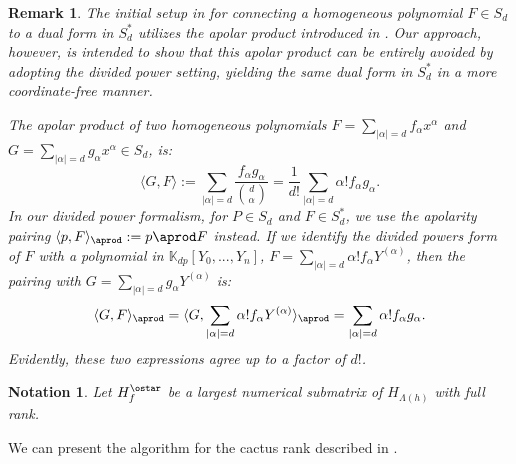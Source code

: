 \documentclass[a4paper,11p]{amsart}
\newtheorem{notation}{Notation}[section]
\newtheorem{remark0}[defn0]{Remark}
\newenvironment{remark}{ \begin{remark0}\rm}{\end{remark0}}
\newcommand{\K}{\mathbb K}
\begin{document}



\begin{remark}
The initial setup in \cite{Alessandra} for connecting a homogeneous polynomial $F \in S_d$ to a dual form in $S_d^*$ utilizes the apolar product introduced in \cite{Bernard}. Our approach, however, is intended to show that this apolar product can be entirely avoided by adopting the divided power setting, yielding the same dual form in $S_d^*$ in a more coordinate-free manner.

The apolar product of two homogeneous polynomials $F=\sum_{|\alpha|=d} f_{\alpha}x^{\alpha}$ and $G=\sum_{|\alpha|=d} g_{\alpha}x^{\alpha}\in S_d$, is: %
\[\langle G,F \rangle:=\sum_{|\alpha|=d} \frac{f_\alpha g_\alpha}{\binom{d}{\alpha}}=\frac{1}{d!}\sum_{|\alpha|=d} \alpha! f_\alpha g_\alpha. \]
In our divided power formalism, for $P\in S_d$ and $F\in S_d^*$, we use the apolarity pairing $\langle p, F\rangle_{\aprod}:= p\aprod F$ instead. If we identify the divided powers form of $F$ with a polynomial in $\K_{dp}[Y_0,...,Y_n]$, $F=\sum_{|\alpha|=d}\alpha! f_\alpha Y^{(\alpha)}$, then the pairing with $G=\sum_{|\alpha|=d} g_{\alpha}Y^{(\alpha)}$ is:
\[\langle G,F\rangle_\aprod=\langle G,\sum_{|\alpha|=d} \alpha! f_\alpha Y^{(\alpha)}\rangle_\aprod =\sum_{|\alpha|=d} \alpha! f_\alpha g_\alpha.\]
Evidently, these two expressions agree up to a factor of $d!$.
\end{remark}



\begin{notation}\label{notation: InitialRank}
Let $H_f^{\ostar}$ be a largest numerical submatrix of $H_{\Lambda(h)}$  with full rank.
\end{notation}
We can present the algorithm for the cactus rank described in \cite{Alessandra}.
  
\end{document}
